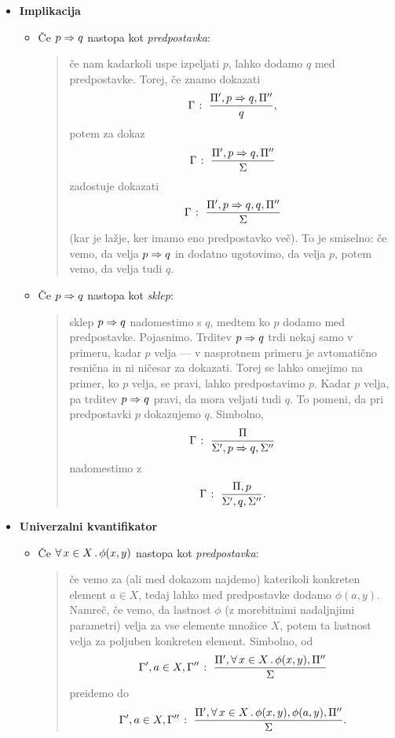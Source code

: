 \begin{itemize}
\begin{itemize}
\begin{quote}
					\end{quote}
			\end{itemize}
		\item\textbf{Implikacija}
			\begin{itemize}
				\item
					Če $p \Rightarrow q$ nastopa kot \emph{predpostavka}:
					\begin{quote}
						če nam kadarkoli uspe izpeljati $p$, lahko dodamo $q$ med predpostavke. Torej, če znamo dokazati
						\[{\Gamma} \;\colon\; \frac{\Pi', p \Rightarrow q, \Pi''}{q},\]
						potem za dokaz
						\[{\Gamma} \;\colon\; \frac{\Pi', p \Rightarrow q, \Pi''}{\Sigma}\]
						zadostuje dokazati
						\[{\Gamma} \;\colon\; \frac{\Pi', p \Rightarrow q, q, \Pi''}{\Sigma}\]
						(kar je lažje, ker imamo eno predpostavko več). To je smiselno: če vemo, da velja $p \Rightarrow q$ in dodatno ugotovimo, da velja $p$, potem vemo, da velja tudi $q$.
					\end{quote}
				\item
					Če $p \Rightarrow q$ nastopa kot \emph{sklep}:
					\begin{quote}
						sklep $p \Rightarrow q$ nadomestimo s $q$, medtem ko $p$ dodamo med predpostavke. Pojasnimo. Trditev $p \Rightarrow q$ trdi nekaj samo v primeru, kadar $p$ velja --- v nasprotnem primeru je avtomatično resnična in ni ničesar za dokazati. Torej se lahko omejimo na primer, ko $p$ velja, se pravi, lahko predpostavimo $p$. Kadar $p$ velja, pa trditev $p \Rightarrow q$ pravi, da mora veljati tudi $q$. To pomeni, da pri predpostavki $p$ dokazujemo $q$. Simbolno,
						\[{\Gamma} \;\colon\; \frac{\Pi}{\Sigma', p \Rightarrow q, \Sigma''}\]
						nadomestimo z
						\[{\Gamma} \;\colon\; \frac{\Pi, p}{\Sigma', q, \Sigma''}.\]
					\end{quote}
			\end{itemize}
		\item\textbf{Univerzalni kvantifikator}
			\begin{itemize}
				\item
					Če $\xall{x}[X]{\phi(x, y)}$ nastopa kot \emph{predpostavka}:
					\begin{quote}
						če vemo za (ali med dokazom najdemo) katerikoli konkreten element $a \in X$, tedaj lahko med predpostavke dodamo $\phi(a, y)$. Namreč, če vemo, da lastnost $\phi$ (z morebitnimi nadaljnjimi parametri) velja za vse elemente množice $X$, potem ta lastnost velja za poljuben konkreten element. Simbolno, od
						\[\claim{\Gamma', a \in X, \Gamma''}{\Pi', \xall{x}[X]{\phi(x, y)}, \Pi''}{\Sigma}\]
						preidemo do
						\[\claim{\Gamma', a \in X, \Gamma''}{\Pi', \xall{x}[X]{\phi(x, y)}, \phi(a, y), \Pi''}{\Sigma}.\]

\end{quote}
\end{itemize}
\end{itemize}
